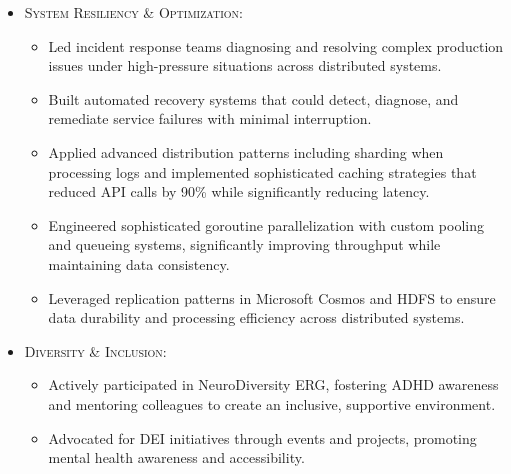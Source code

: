 \begin{itemize}
\begin{itemize}
        \item \scriptsize{\textsc{System Resiliency \& Optimization:}}
        \begin{itemize}
            \item \scriptsize{Led incident response teams diagnosing and resolving complex production issues under high-pressure situations across distributed systems.}
            \item \scriptsize{Built automated recovery systems that could detect, diagnose, and remediate service failures with minimal interruption.}
            \item \scriptsize{Applied advanced distribution patterns including sharding when processing logs and implemented sophisticated caching strategies that reduced API calls by 90\% while significantly reducing latency.}
            \item \scriptsize{Engineered sophisticated goroutine parallelization with custom pooling and queueing systems, significantly improving throughput while maintaining data consistency.}
            \item \scriptsize{Leveraged replication patterns in Microsoft Cosmos and HDFS to ensure data durability and processing efficiency across distributed systems.}
        \end{itemize}

        \item \scriptsize{\textsc{Diversity \& Inclusion:}}
        \begin{itemize}
            \item \scriptsize{Actively participated in NeuroDiversity ERG, fostering ADHD awareness and mentoring colleagues to create an inclusive, supportive environment.}
            \item \scriptsize{Advocated for DEI initiatives through events and projects, promoting mental health awareness and accessibility.}
        \end{itemize}
    \end{itemize}
\end{itemize}
